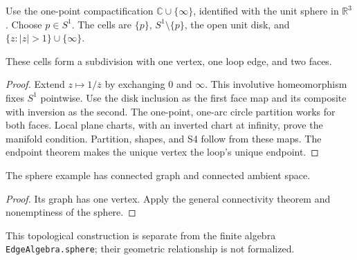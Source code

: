 \begin{definition}\label{def:loop-sphere}

  Use the one-point compactification $\mathbb C\cup\{\infty\}$, identified
  with the unit sphere in $\mathbb R^3$. Choose $p\in S^1$. The cells are
  $\{p\}$, $S^1\setminus\{p\}$, the open unit disk, and
  $\{z:|z|>1\}\cup\{\infty\}$.
\end{definition}

\begin{proposition}\label{prop:loop-sphere-subdivision}

  These cells form a subdivision with one vertex, one loop edge, and two faces.
\end{proposition}
\begin{proof}

  Extend $z\mapsto1/\overline z$ by exchanging $0$ and $\infty$.
  This involutive homeomorphism fixes $S^1$ pointwise. Use the disk inclusion
  as the first face map and its composite with inversion as the second.
  The one-point, one-arc circle partition works for both faces. Local plane
  charts, with an inverted chart at infinity, prove the manifold condition.
  Partition, shapes, and S4 follow from these maps. The endpoint theorem makes
  the unique vertex the loop's unique endpoint.
\end{proof}

\begin{corollary}\label{cor:loop-sphere-connected}

  The sphere example has connected graph and connected ambient space.
\end{corollary}
\begin{proof}

  Its graph has one vertex. Apply the general connectivity theorem and
  nonemptiness of the sphere.
\end{proof}
This topological construction is separate from the finite algebra
\texttt{EdgeAlgebra.sphere}; their geometric relationship is not formalized.

